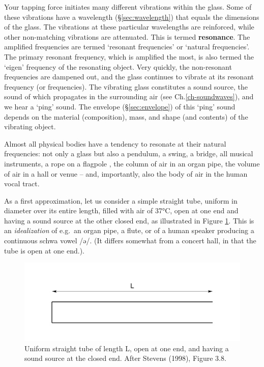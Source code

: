 \documentclass[
]{book}
\begin{document}
Your tapping force initiates many different vibrations within the glass. Some of these vibrations have a wavelength (§\ref{sec:wavelength}) that equals the dimensions of the glass. The vibrations at these particular wavelengths are reinforced, while other non-matching vibrations are attenuated. This is termed \textbf{resonance}. The amplified frequencies are termed `resonant frequencies' or `natural frequencies'. The primary resonant frequency, which is amplified the most, is also termed the `eigen' frequency of the resonating object. Very quickly, the non-resonant frequencies are dampened out, and the glass continues to vibrate at its resonant frequency (or frequencies). The vibrating glass constitutes a sound source, the sound of which propagates in the surrounding air (see Ch.\ref{ch-soundwaves}), and we hear a `ping' sound. The envelope (§\ref{sec:envelope}) of this `ping' sound depends on the material (composition), mass, and shape (and contents) of the vibrating object.

Almost all physical bodies have a tendency to resonate at their natural frequencies: not only a glass but also a pendulum, a swing, a bridge, all musical instruments, a rope on a flagpole \citep[§61]{Minnaert_1970v2}, the column of air in an organ pipe, the volume of air in a hall or venue -- and, importantly, also the body of air in the human vocal tract.

As a first approximation, let us consider a simple straight tube, uniform in diameter over its entire length, filled with air of 37°C, open at one end and having a sound source at the other closed end, as illustrated in Figure \ref{fig:onetube}. This is an \emph{idealization} of e.g.~an organ pipe, a flute, or of a human speaker producing a continuous schwa vowel /ə/. (It differs somewhat from a concert hall, in that the tube is open at one end.).

\begin{figure}

{\centering \includegraphics{figures/onetube} 

}

\caption{Uniform straight tube of length L, open at one end, and having a sound source at the closed end. After Stevens (1998), Figure 3.8.}\label{fig:onetube}
\end{figure}
\end{document}
